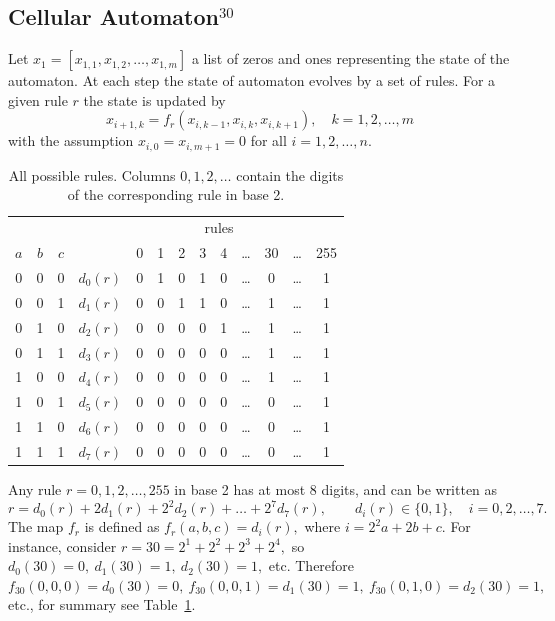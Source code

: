 \documentclass[a4paper, fleqn, 10pt]{report}
\theoremstyle{definition}
\begin{document}
\subsection*{Cellular Automaton$^{30}$}
Let $x_1=[x_{1,1},x_{1,2},\dots,x_{1,m}]$ a list of zeros and ones representing the state of the automaton.
At each step the state of automaton evolves by a set of rules.
For a given rule $r$ the state is updated by
\[x_{i+1,k} = f_r(x_{i,k-1}, x_{i,k}, x_{i,k+1}),\quad k=1,2,\dots,m\]
with the assumption $x_{i,0} = x_{i,m+1} = 0$ for all $i=1,2,\dots,n.$
\begin{table}[ht!]\centering
 \begin{tabular}{ccccccccccccc}
 \toprule
      &     &     &  &\multicolumn{8}{c}{rules} \\
      \cmidrule{5-13}
  $a$ & $b$ & $c$ &  & 0 & 1 & 2 & 3 & 4 &\dots & 30 &\dots  & 255 \\
  \midrule
  0 & 0 & 0 & $d_0(r)$ & 0 & 1 & 0 & 1 & 0 & \dots & 0 &\dots & 1\\
  0 & 0 & 1 & $d_1(r)$ & 0 & 0 & 1 & 1 & 0 & \dots & 1 &\dots & 1\\
  0 & 1 & 0 & $d_2(r)$ & 0 & 0 & 0 & 0 & 1 & \dots & 1 &\dots & 1\\
  0 & 1 & 1 & $d_3(r)$ & 0 & 0 & 0 & 0 & 0 & \dots & 1 &\dots & 1\\
  1 & 0 & 0 & $d_4(r)$ & 0 & 0 & 0 & 0 & 0 & \dots & 1 &\dots & 1\\
  1 & 0 & 1 & $d_5(r)$ & 0 & 0 & 0 & 0 & 0 & \dots & 0 &\dots & 1\\
  1 & 1 & 0 & $d_6(r)$ & 0 & 0 & 0 & 0 & 0 & \dots & 0 &\dots & 1\\
  1 & 1 & 1 & $d_7(r)$ & 0 & 0 & 0 & 0 & 0 & \dots & 0 &\dots & 1\\
  \bottomrule
 \end{tabular}
\caption{All possible rules. Columns $0,1,2,\dots$ contain the digits of the corresponding rule in base 2.}\label{tab:rules}
\end{table}
Any rule $r=0,1,2,\dots,255$ in base 2 has at most 8 digits, and can be written as
\[r = d_0(r) + 2 d_1(r) + 2^2d_2(r) + \dots + 2^7d_7(r), \qquad d_i(r)\in\{0,1\},\quad i=0,2,\dots,7.\]
The map $f_r$ is defined as $f_r(a,b,c) = d_i(r),$ where $i=2^2a + 2b + c.$
For instance, consider $r = 30 = 2^1 + 2^2 + 2^3 + 2^4,$ so $d_0(30) = 0,\: d_1(30) = 1,\: d_2(30) = 1,$ etc.
Therefore $f_{30}(0,0,0)=d_0(30) = 0,\: f_{30}(0,0,1)=d_1(30) = 1,\: f_{30}(0,1,0)=d_2(30) = 1,$ etc., for summary see Table~\ref{tab:rules}.
\end{document}
